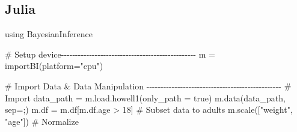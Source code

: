 \documentclass[
  letterpaper,
  DIV=11,
  numbers=noendperiod]{scrartcl}
\newenvironment{Shaded}{\begin{snugshade}}{\end{snugshade}}
\newcommand{\BuiltInTok}[1]{\textcolor[rgb]{0.00,0.23,0.31}{#1}}
\newcommand{\CharTok}[1]{\textcolor[rgb]{0.13,0.47,0.30}{#1}}
\newcommand{\CommentTok}[1]{\textcolor[rgb]{0.37,0.37,0.37}{#1}}
\newcommand{\ConstantTok}[1]{\textcolor[rgb]{0.56,0.35,0.01}{#1}}
\newcommand{\FloatTok}[1]{\textcolor[rgb]{0.68,0.00,0.00}{#1}}
\newcommand{\FunctionTok}[1]{\textcolor[rgb]{0.28,0.35,0.67}{#1}}
\newcommand{\ImportTok}[1]{\textcolor[rgb]{0.00,0.46,0.62}{#1}}
\newcommand{\NormalTok}[1]{\textcolor[rgb]{0.00,0.23,0.31}{#1}}
\newcommand{\OperatorTok}[1]{\textcolor[rgb]{0.37,0.37,0.37}{#1}}
\newcommand{\StringTok}[1]{\textcolor[rgb]{0.13,0.47,0.30}{#1}}
\begin{document}
\subsection{Julia}

\begin{Shaded}
\begin{Highlighting}[]
\ImportTok{using} \BuiltInTok{BayesianInference}

\CommentTok{\# Setup device{-}{-}{-}{-}{-}{-}{-}{-}{-}{-}{-}{-}{-}{-}{-}{-}{-}{-}{-}{-}{-}{-}{-}{-}{-}{-}{-}{-}{-}{-}{-}{-}{-}{-}{-}{-}{-}{-}{-}{-}{-}{-}{-}{-}{-}{-}{-}{-}}
\NormalTok{m }\OperatorTok{=} \FunctionTok{importBI}\NormalTok{(platform}\OperatorTok{=}\StringTok{"cpu"}\NormalTok{)}

\CommentTok{\# Import Data \& Data Manipulation {-}{-}{-}{-}{-}{-}{-}{-}{-}{-}{-}{-}{-}{-}{-}{-}{-}{-}{-}{-}{-}{-}{-}{-}{-}{-}{-}{-}{-}{-}{-}{-}{-}{-}{-}{-}{-}{-}{-}{-}{-}{-}{-}{-}{-}{-}{-}{-}}
\CommentTok{\# Import}
\NormalTok{data\_path }\OperatorTok{=}\NormalTok{ m.load.}\FunctionTok{howell1}\NormalTok{(only\_path }\OperatorTok{=} \ConstantTok{true}\NormalTok{)}
\NormalTok{m.}\FunctionTok{data}\NormalTok{(data\_path, sep}\OperatorTok{=}\CharTok{\textquotesingle{};\textquotesingle{}}\NormalTok{)}
\NormalTok{m.df }\OperatorTok{=}\NormalTok{ m.df[m.df.age }\OperatorTok{\textgreater{}} \FloatTok{18}\NormalTok{] }\CommentTok{\# Subset data to adults}
\NormalTok{m.}\FunctionTok{scale}\NormalTok{([}\StringTok{"weight"}\NormalTok{, }\StringTok{"age"}\NormalTok{]) }\CommentTok{\# Normalize}


\end{Highlighting}
\end{Shaded}
\end{document}
